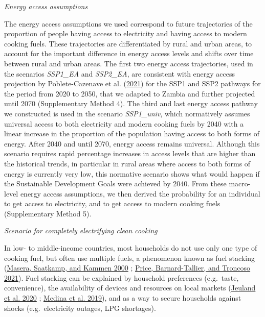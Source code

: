 \documentclass[
]{article}
\begin{document}
\newpage

\emph{Energy access assumptions}

The energy access assumptions we used correspond to future trajectories of the proportion of people having access to electricity and having access to modern cooking fuels. These trajectories are differentiated by rural and urban areas, to account for the important difference in energy access levels and shifts over time between rural and urban areas. The first two energy access trajectories, used in the scenarios \emph{SSP1\_EA} and \emph{SSP2\_EA}, are consistent with energy access projection by Poblete-Cazenave et al. (\protect\hyperlink{ref-poblete-cazenave_global_2021}{2021}) for the SSP1 and SSP2 pathways for the period from 2020 to 2050, that we adapted to Zambia and further projected until 2070 (Supplementary Method 4). The third and last energy access pathway we constructed is used in the scenario \emph{SSP1\_univ}, which normatively assumes universal access to both electricity and modern cooking fuels by 2040 with a linear increase in the proportion of the population having access to both forms of energy. After 2040 and until 2070, energy access remains universal. Although this scenario requires rapid percentage increases in access levels that are higher than the historical trends, in particular in rural areas where access to both forms of energy is currently very low, this normative scenario shows what would happen if the Sustainable Development Goals were achieved by 2040. From these macro-level energy access assumptions, we then derived the probability for an individual to get access to electricity, and to get access to modern cooking fuels (Supplementary Method 5).

\emph{Scenario for completely electrifying clean cooking}

In low- to middle-income countries, most households do not use only one type of cooking fuel, but often use multiple fuels, a phenomenon known as fuel stacking (\protect\hyperlink{ref-masera_linear_2000}{Masera, Saatkamp, and Kammen 2000} ; \protect\hyperlink{ref-price_stacked_2021}{Price, Barnard-Tallier, and Troncoso 2021}).
Fuel stacking can be explained by household preferences (e.g.~taste, convenience), the availability of devices and resources on local markets (\protect\hyperlink{ref-jeuland_preferences_2020}{Jeuland et al. 2020} ; \protect\hyperlink{ref-medina_understanding_2019}{Medina et al. 2019}), and as a way to secure households against shocks (e.g.~electricity outages, LPG shortages).
\end{document}
